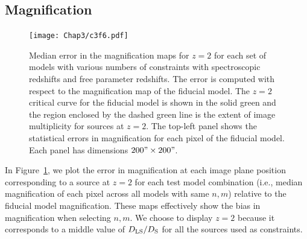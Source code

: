 \subsection{Magnification}
\label{chap3:subsec:magnification}
%
%
%
%

\begin{figure}
\center
\texttt{[image: Chap3/c3f6.pdf]}
\caption[Error in magnification of test models]{Median error in the magnification maps for $z=2$ for each set of models with various numbers of constraints with spectroscopic redshifts and free parameter redshifts. The error is computed with respect to the magnification map of the fiducial model. The $z=2$ critical curve for the fiducial model is shown in the solid green and the region enclosed by the dashed green line is the extent of image multiplicity for sources at $z=2$. The top-left panel shows the statistical errors in magnification for each pixel of the fiducial model. Each panel has dimensions $200"\times200"$.}
\label{chap3:fig:magnification_bias}
\end{figure}

In Figure~\ref{chap3:fig:magnification_bias}, we plot the error in magnification at each image plane position corresponding to a source at $z=2$ for each test model combination (i.e., median magnification of each pixel across all models with same $n,m$) relative to the fiducial model magnification. These maps effectively show the bias in magnification when selecting $n,m$. We choose to display $z=2$ because it corresponds to a middle value of $D_\mathrm{LS}/D_\mathrm{S}$ for all the sources used as constraints.

